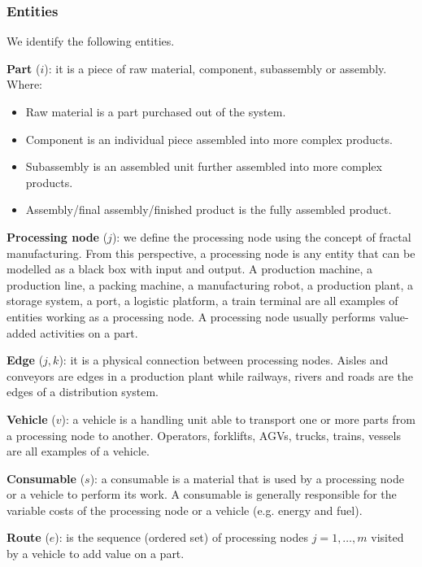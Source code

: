 \subsubsection{Entities}
We identify the following entities.\par
\textbf{Part} ($i$): it is a piece of raw material, component, subassembly or assembly. Where:
\begin{itemize}
    \item Raw material is a part purchased out of the system.
    \item Component is an individual piece assembled into more complex products.
    \item Subassembly is an assembled unit further assembled into more complex products.
    \item Assembly/final assembly/finished product is the fully assembled product.
\end{itemize}
\par
\textbf{Processing node} ($j$): we define the processing node using the concept of fractal manufacturing. From this perspective, a processing node is any entity that can be modelled as a black box with input and output. A production machine, a production line, a packing machine, a manufacturing robot, a production plant, a storage system, a port, a logistic platform, a train terminal are all examples of entities working as a processing node. A processing node usually performs value-added activities on a part. \par

\textbf{Edge} ($j,k$): it is a physical connection between processing nodes. Aisles and conveyors are edges in a production plant while railways, rivers and roads are the edges of a distribution system.\par

\textbf{Vehicle} ($v$): a vehicle is a handling unit able to transport one or more parts from a processing node to another. Operators, forklifts, AGVs, trucks, trains, vessels are all examples of a vehicle. \par

\textbf{Consumable} ($s$): a consumable is a material that is used by a processing node or a vehicle to perform its work. A consumable is generally responsible for the variable costs of the processing node or a vehicle (e.g. energy and fuel).\par

\textbf{Route} ($e$): is the sequence (ordered set) of processing nodes $j=1,\ldots,m$ visited by a vehicle to add value on a part.\par


